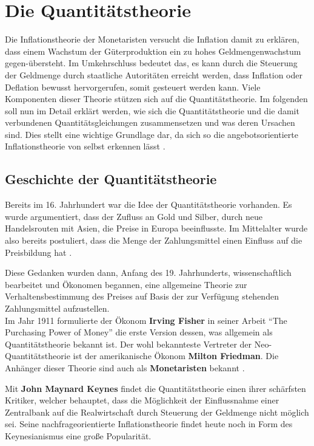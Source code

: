 \chapter{Die Quantitätstheorie}

Die Inflationstheorie der Monetaristen versucht die Inflation damit zu erklären, dass einem Wachstum der Güterproduktion ein zu hohes Geldmengenwachstum gegen-übersteht. Im Umkehrschluss bedeutet das, es kann durch die Steuerung der Geldmenge durch staatliche Autoritäten erreicht werden, dass Inflation oder Deflation bewusst hervorgerufen, somit gesteuert werden kann. Viele Komponenten dieser Theorie stützen sich auf die Quantitätstheorie. Im folgenden soll nun im Detail erklärt werden, wie sich die Quantitätstheorie und die damit verbundenen Quantitätsgleichungen zusammensetzen und was deren Ursachen sind. Dies stellt eine wichtige Grundlage dar, da sich so die angebotsorientierte Inflationstheorie von selbst erkennen lässt \autocite{brunner1970}.

\section{Geschichte der Quantitätstheorie}
Bereits im 16. Jahrhundert war die Idee der Quantitätstheorie vorhanden. Es wurde argumentiert, dass der Zufluss an Gold und Silber, durch neue Handelsrouten mit Asien, die Preise in Europa beeinflusste. Im Mittelalter wurde also bereits postuliert, dass die Menge der Zahlungsmittel einen Einfluss auf die Preisbildung hat \autocite{Woll1977}.

Diese Gedanken wurden dann, Anfang des 19. Jahrhunderts, wissenschaftlich bearbeitet und Ökonomen begannen, eine allgemeine Theorie zur Verhaltensbestimmung des Preises auf Basis der zur Verfügung stehenden Zahlungsmittel aufzustellen.\\
Im Jahr 1911 formulierte der Ökonom \textbf{Irving Fisher} in seiner Arbeit \enquote{The Purchasing Power of Money} die erste Version dessen, was allgemein als Quantitätstheorie bekannt ist. Der wohl bekannteste Vertreter der Neo-Quantitätstheorie ist der amerikanische Ökonom \textbf{Milton Friedman}. Die Anhänger dieser Theorie sind auch als \textbf{Monetaristen} bekannt \autocite[Kapitel~3,S.~10-12]{historyQunatitaetstheorie}.

Mit \textbf{John Maynard Keynes} findet die Quantitätstheorie einen ihrer schärfsten Kritiker, welcher behauptet, dass die Möglichkeit der Einflussnahme einer Zentralbank auf die Realwirtschaft durch Steuerung der Geldmenge nicht möglich sei. Seine nachfrageorientierte Inflationstheorie findet heute noch in Form des Keynesianismus eine große Popularität.

